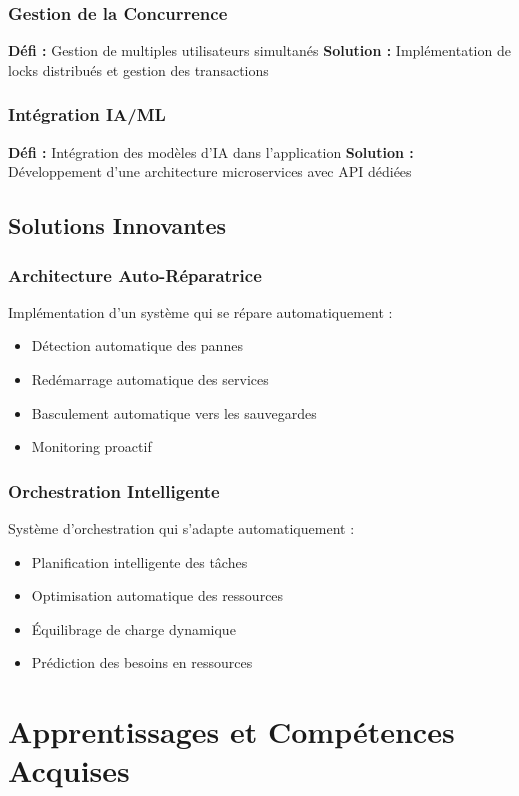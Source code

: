 \documentclass[12pt,a4paper]{article}
\begin{document}
\subsubsection{Gestion de la Concurrence}
\textbf{Défi :} Gestion de multiples utilisateurs simultanés
\textbf{Solution :} Implémentation de locks distribués et gestion des transactions

\subsubsection{Intégration IA/ML}
\textbf{Défi :} Intégration des modèles d'IA dans l'application
\textbf{Solution :} Développement d'une architecture microservices avec API dédiées

\subsection{Solutions Innovantes}

\subsubsection{Architecture Auto-Réparatrice}
Implémentation d'un système qui se répare automatiquement :
\begin{itemize}
    \item Détection automatique des pannes
    \item Redémarrage automatique des services
    \item Basculement automatique vers les sauvegardes
    \item Monitoring proactif
\end{itemize}

\subsubsection{Orchestration Intelligente}
Système d'orchestration qui s'adapte automatiquement :
\begin{itemize}
    \item Planification intelligente des tâches
    \item Optimisation automatique des ressources
    \item Équilibrage de charge dynamique
    \item Prédiction des besoins en ressources
\end{itemize}

\section{Apprentissages et Compétences Acquises}
\end{document}
